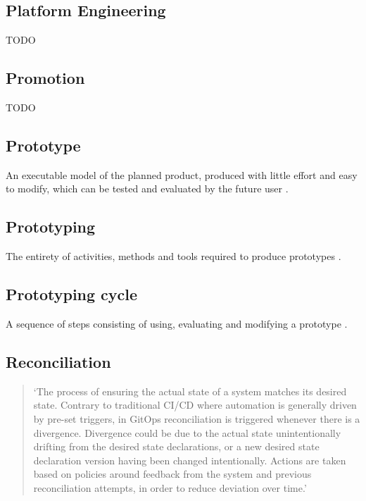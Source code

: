 \subsection*{Platform Engineering}

TODO

\subsection*{Promotion}
TODO

\subsection*{Prototype}
An executable model of the planned product, produced with little effort and easy to modify,
which can be tested and evaluated by the future user
\autocite{riedlManagementInformatik2019}.

\subsection*{Prototyping}
The entirety of activities, methods and tools required to produce prototypes
\autocite{riedlManagementInformatik2019}.

\subsection*{Prototyping cycle}
A sequence of steps consisting of using, evaluating and modifying a prototype
\autocite{riedlManagementInformatik2019}.





\subsection*{Reconciliation}
\begin{quotation}
\noindent
\enquote*{The process of ensuring the actual state of a system matches its desired state. Contrary to traditional CI/CD where automation is generally driven by pre-set triggers, in GitOps reconciliation is triggered whenever there is a divergence. Divergence could be due to the actual state unintentionally drifting from the desired state declarations, or a new desired state declaration version having been changed intentionally. Actions are taken based on policies around feedback from the system and previous reconciliation attempts, in order to reduce deviation over time.}
\autocite{gitopsGlossary}
\end{quotation}

